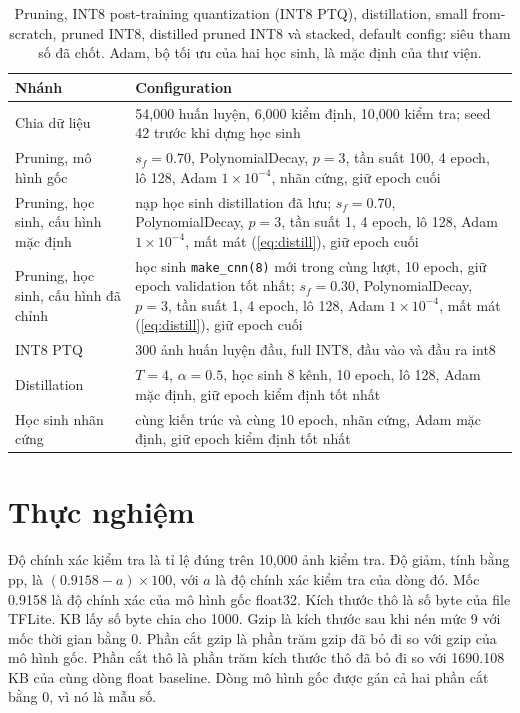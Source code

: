 \documentclass[13pt,a4paper]{article}
\begin{document}
\begin{table}[H]
\centering
\caption{Pruning, INT8 post-training quantization (INT8 PTQ), distillation, small from-scratch, pruned INT8, distilled pruned INT8 và stacked, default config: siêu tham số đã chốt. Adam, bộ tối ưu của hai học sinh, là mặc định của thư viện.}
\label{tab:hyper}
\begin{tabularx}{\textwidth}{|l|Y|}
\hline
Nhánh & Configuration \\ \hline
Chia dữ liệu & 54{,}000 huấn luyện, 6{,}000 kiểm định, 10{,}000 kiểm tra; seed 42 trước khi dựng học sinh \\ \hline
Pruning, mô hình gốc & \(s_f = 0.70\), PolynomialDecay, \(p = 3\), tần suất 100, 4 epoch, lô 128, Adam \(1\times 10^{-4}\), nhãn cứng, giữ epoch cuối \\ \hline
Pruning, học sinh, cấu hình mặc định & nạp học sinh distillation đã lưu; \(s_f = 0.70\), PolynomialDecay, \(p = 3\), tần suất 1, 4 epoch, lô 128, Adam \(1\times 10^{-4}\), mất mát (\ref{eq:distill}), giữ epoch cuối \\ \hline
Pruning, học sinh, cấu hình đã chỉnh & học sinh \texttt{make\_cnn(8)} mới trong cùng lượt, 10 epoch, giữ epoch validation tốt nhất; \(s_f = 0.30\), PolynomialDecay, \(p = 3\), tần suất 1, 4 epoch, lô 128, Adam \(1\times 10^{-4}\), mất mát (\ref{eq:distill}), giữ epoch cuối \\ \hline
INT8 PTQ & 300 ảnh huấn luyện đầu, full INT8, đầu vào và đầu ra int8 \\ \hline
Distillation & \(T = 4\), \(\alpha = 0.5\), học sinh 8 kênh, 10 epoch, lô 128, Adam mặc định, giữ epoch kiểm định tốt nhất \\ \hline
Học sinh nhãn cứng & cùng kiến trúc và cùng 10 epoch, nhãn cứng, Adam mặc định, giữ epoch kiểm định tốt nhất \\ \hline
\end{tabularx}
\end{table}

\section{Thực nghiệm}

Độ chính xác kiểm tra là tỉ lệ đúng trên 10{,}000 ảnh kiểm tra.
Độ giảm, tính bằng pp, là \((0.9158 - a)\times 100\), với \(a\) là độ chính xác kiểm tra của dòng đó.
Mốc 0.9158 là độ chính xác của mô hình gốc float32.
Kích thước thô là số byte của file TFLite.
KB lấy số byte chia cho 1000.
Gzip là kích thước sau khi nén mức 9 với mốc thời gian bằng 0.
Phần cắt gzip là phần trăm gzip đã bỏ đi so với gzip của mô hình gốc.
Phần cắt thô là phần trăm kích thước thô đã bỏ đi so với 1690.108 KB của cùng dòng float baseline.
Dòng mô hình gốc được gán cả hai phần cắt bằng 0, vì nó là mẫu số.
\end{document}
